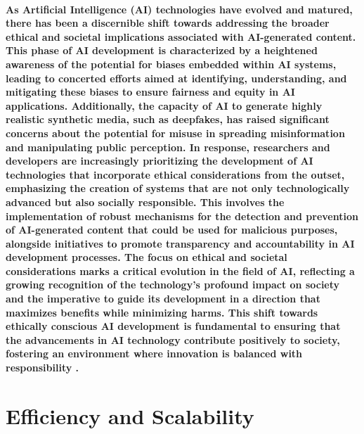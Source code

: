 \documentclass[11pt,a4paper,oneside]{report}
\begin{document}
\paragraph{As Artificial Intelligence (AI) technologies have evolved and matured, there has been a discernible shift towards addressing the broader ethical and societal implications associated with AI-generated content. This phase of AI development is characterized by a heightened awareness of the potential for biases embedded within AI systems, leading to concerted efforts aimed at identifying, understanding, and mitigating these biases to ensure fairness and equity in AI applications. Additionally, the capacity of AI to generate highly realistic synthetic media, such as deepfakes, has raised significant concerns about the potential for misuse in spreading misinformation and manipulating public perception. In response, researchers and developers are increasingly prioritizing the development of AI technologies that incorporate ethical considerations from the outset, emphasizing the creation of systems that are not only technologically advanced but also socially responsible. This involves the implementation of robust mechanisms for the detection and prevention of AI-generated content that could be used for malicious purposes, alongside initiatives to promote transparency and accountability in AI development processes. The focus on ethical and societal considerations marks a critical evolution in the field of AI, reflecting a growing recognition of the technology's profound impact on society and the imperative to guide its development in a direction that maximizes benefits while minimizing harms. This shift towards ethically conscious AI development is fundamental to ensuring that the advancements in AI technology contribute positively to society, fostering an environment where innovation is balanced with responsibility \cite{esposito2023mitigating}.}

\section{Efficiency and Scalability}
\end{document}
